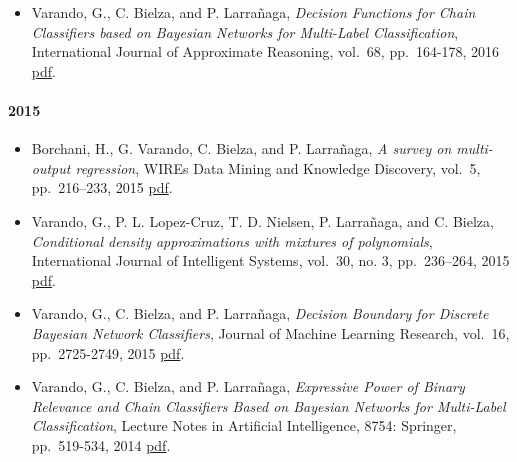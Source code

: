 \documentclass[]{article}
\providecommand{\tightlist}{%
  \setlength{\itemsep}{0pt}\setlength{\parskip}{0pt}}
\let\oldparagraph\paragraph
\renewcommand{\paragraph}[1]{\oldparagraph{#1}\mbox{}}
\begin{document}
\begin{itemize}
\tightlist
\item
  Varando, G., C. Bielza, and P. Larrañaga, \emph{Decision Functions for
  Chain Classifiers based on Bayesian Networks for Multi-Label
  Classification}, International Journal of Approximate Reasoning,
  vol.~68, pp.~164-178, 2016
  \href{http://cig.fi.upm.es/articles/2016/Varando-Decision\%20functions\%20for\%20chain\%20classifiers.pdf}{pdf}.
\end{itemize}

\hypertarget{section-2}{%
\paragraph{2015}\label{section-2}}

\begin{itemize}
\tightlist
\item
  Borchani, H., G. Varando, C. Bielza, and P. Larrañaga, \emph{A survey
  on multi-output regression}, WIREs Data Mining and Knowledge
  Discovery, vol.~5, pp.~216--233, 2015
  \href{http://cig.fi.upm.es/articles/2016/Varando-Decision\%20functions\%20for\%20chain\%20classifiers.pdf}{pdf}.
\item
  Varando, G., P. L. Lopez-Cruz, T. D. Nielsen, P. Larrañaga, and C.
  Bielza, \emph{Conditional density approximations with mixtures of
  polynomials}, International Journal of Intelligent Systems, vol.~30,
  no. 3, pp.~236--264, 2015
  \href{http://cig.fi.upm.es/articles/2016/Varando-Decision\%20functions\%20for\%20chain\%20classifiers.pdf}{pdf}.
\item
  Varando, G., C. Bielza, and P. Larrañaga, \emph{Decision Boundary for
  Discrete Bayesian Network Classifiers}, Journal of Machine Learning
  Research, vol.~16, pp.~2725-2749, 2015
  \href{http://jmlr.csail.mit.edu/papers/volume16/varando15a/varando15a.pdf}{pdf}.
\item
  Varando, G., C. Bielza, and P. Larrañaga, \emph{Expressive Power of
  Binary Relevance and Chain Classifiers Based on Bayesian Networks for
  Multi-Label Classification}, Lecture Notes in Artificial Intelligence,
  8754: Springer, pp.~519-534, 2014
  \href{https://link.springer.com/chapter/10.1007\%2F978-3-319-11433-0_34}{pdf}.
\end{itemize}
\end{document}
